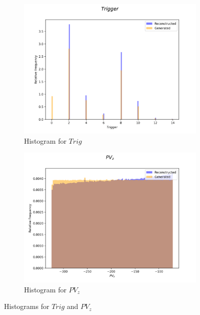 \documentclass{article}
\begin{document}
\begin{figure}[H]
    \centering
    \begin{subfigure}[b]{0.45\textwidth}
        \includegraphics[width=\textwidth]{graphs/hadr_Trigger.png}
        \caption{Histogram for $Trig$}
        \label{fig:had_Trig}
    \end{subfigure}
    \hfill
    \begin{subfigure}[b]{0.45\textwidth}
        \includegraphics[width=\textwidth]{graphs/hadr_PV_z.png}
        \caption{Histogram for $PV_z$}
        \label{fig:had_PV_z}
    \end{subfigure}
    \caption{Histograms for $Trig$ and $PV_z$}
\end{figure}
\end{document}
